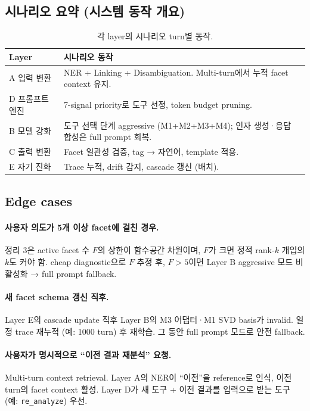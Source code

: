 \subsection{시나리오 요약 (시스템 동작 개요)}

\begin{table}[h]
\centering
\caption{각 layer의 시나리오 turn별 동작.}
\label{tab:scenario-summary}
\small
\begin{tabular}{lp{}}
\toprule
Layer & 시나리오 동작 \\
\midrule
A 입력 변환 & NER + Linking + Disambiguation. Multi-turn에서 누적 facet context 유지. \\
D 프롬프트 엔진 & 7-signal priority로 도구 선정, token budget pruning. \\
B 모델 강화 & 도구 선택 단계 aggressive (M1+M2+M3+M4); 인자 생성·응답 합성은 full prompt 회복. \\
C 출력 변환 & Facet 일관성 검증, tag → 자연어, template 적용. \\
E 자기 진화 & Trace 누적, drift 감지, cascade 갱신 (배치). \\
\bottomrule
\end{tabular}
\end{table}

\subsection{Edge cases}

\paragraph{사용자 의도가 5개 이상 facet에 걸친 경우.}
정리 3은 active facet 수 $F$의 상한이 함수공간 차원이며, $F$가 크면 정적 rank-$k$ 개입의 $k$도 커야 함. cheap diagnostic으로 $F$ 추정 후, $F > 5$이면 Layer B aggressive 모드 비활성화 → full prompt fallback.

\paragraph{새 facet schema 갱신 직후.}
Layer E의 cascade update 직후 Layer B의 M3 어댑터·M1 SVD basis가 invalid. 일정 trace 재누적 (예: 1000 turn) 후 재학습. 그 동안 full prompt 모드로 안전 fallback.

\paragraph{사용자가 명시적으로 ``이전 결과 재분석'' 요청.}
Multi-turn context retrieval. Layer A의 NER이 ``이전''을 reference로 인식, 이전 turn의 facet context 활성. Layer D가 새 도구 + 이전 결과를 입력으로 받는 도구 (예: \texttt{re\_analyze}) 우선.

